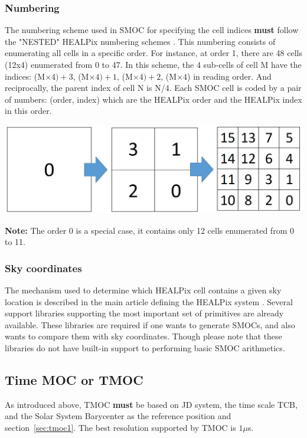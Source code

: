 \documentclass[11pt,a4paper]{ivoa}
\begin{document}
\subsubsection{Numbering}

The numbering scheme used in SMOC for specifying the cell indices {\bf
  must} follow the "NESTED" HEALPix numbering schemes
\citep{2005ApJ...622..759G}. This numbering consists of enumerating all cells in a
specific order. For instance, at order 1, there are 48 cells (12x4)
enumerated from 0 to 47. In this scheme, the 4 sub-cells of cell M
have the indices: (M$\times4)+3$, (M$\times4)+1$, (M$\times4)+2$,
(M$\times4$) in reading
order. And reciprocally, the parent index of cell N is
N/4. Each SMOC cell is coded by a pair of numbers:
(order, index) which are the HEALPix order and the HEALPix index in this
order.

\begin{adjustbox}{center,caption={HEALPix numbering principle},
    label={Fig:HEALPix numbering},nofloat=figure,vspace=\bigskipamount}
\includegraphics[width=\textwidth]{nested_healpix.jpg}
\end{adjustbox}

{\bf Note:} The order 0 is a special case, it contains only 12
cells enumerated from 0 to 11.


\subsubsection{Sky coordinates}
The mechanism used to determine which HEALPix cell contains a given
sky location is described in the main article defining the HEALPix
system \citep{2005ApJ...622..759G}. Several support libraries
supporting the most important set of primitives are already available.
These libraries are required if one wants to generate SMOCs, and also
wants to compare them with sky coordinates. Though please
note that these libraries do not have built-in support to performing
basic SMOC arithmetics.

\subsection{Time MOC or TMOC}
As introduced above, TMOC {\bf must} be based on JD system, the time
scale TCB, and the Solar System Barycenter as the reference
position \citep[see also][]{2019ASPC..523..497F} and section~\ref{sec:tmoc1}.
The best resolution supported by TMOC is $1 \mu$s.
\end{document}
